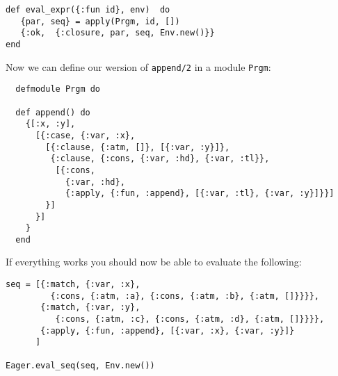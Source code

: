 \documentclass[a4paper,11pt]{article}
\begin{document}
\begin{verbatim}
def eval_expr({:fun id}, env)  do
   {par, seq} = apply(Prgm, id, [])
   {:ok,  {:closure, par, seq, Env.new()}}
end
\end{verbatim}

\noindent Now we can define our wersion of {\tt append/2} in a module {\tt Prgm}:

\begin{verbatim}
  defmodule Prgm do

  def append() do
    {[:x, :y],
      [{:case, {:var, :x}, 
        [{:clause, {:atm, []}, [{:var, :y}]},
         {:clause, {:cons, {:var, :hd}, {:var, :tl}}, 
          [{:cons, 
            {:var, :hd}, 
            {:apply, {:fun, :append}, [{:var, :tl}, {:var, :y}]}}]
        }]
      }]
    }
  end
\end{verbatim}

\noindent If everything works you should now be able to evaluate the following:

\begin{verbatim}
seq = [{:match, {:var, :x}, 
         {:cons, {:atm, :a}, {:cons, {:atm, :b}, {:atm, []}}}},
       {:match, {:var, :y}, 
          {:cons, {:atm, :c}, {:cons, {:atm, :d}, {:atm, []}}}},
       {:apply, {:fun, :append}, [{:var, :x}, {:var, :y}]}
      ]
    
Eager.eval_seq(seq, Env.new())
\end{verbatim}
\end{document}
